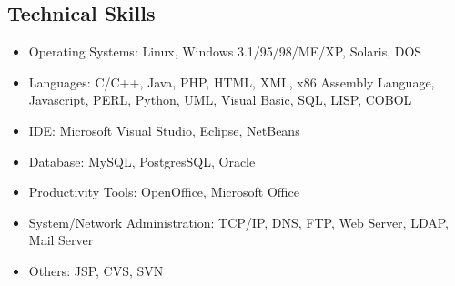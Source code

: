 \documentclass[overlapped,line,letterpaper]{res}
\begin{document}
\begin{resume}





%


\section{\bf Technical Skills}

\begin{itemize}
\item Operating Systems: Linux, Windows 3.1/95/98/ME/XP, Solaris, DOS
\item Languages: C/C++, Java, PHP, HTML, XML, x86 Assembly Language, Javascript, PERL, Python,
UML, Visual Basic, SQL, LISP, COBOL
\item IDE: Microsoft Visual Studio, Eclipse, NetBeans
\item Database: MySQL, PostgresSQL, Oracle
\item Productivity Tools: OpenOffice, Microsoft Office
\item System/Network Administration: TCP/IP, DNS, FTP, Web Server, LDAP, Mail Server
\item Others: JSP, CVS, SVN
\end{itemize}



\end{resume}
\end{document}
